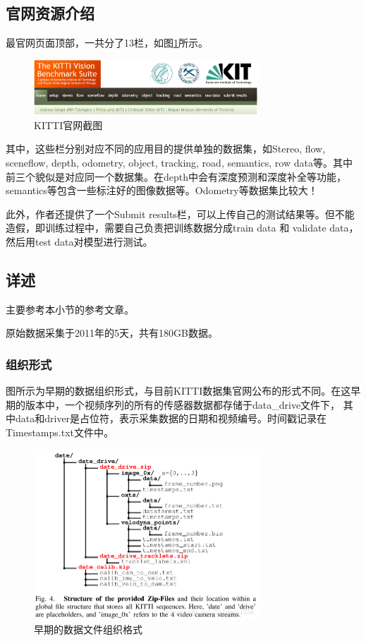 \subsection{官网资源介绍}

最官网页面顶部，一共分了13栏，如图\ref{KITTI0}所示。

\begin{figure}[!hbtp]
\centering
\includegraphics[width=0.75\textwidth]{SemanticSLAM/KITTI0.png}
\caption{KITTI官网截图}
\label{KITTI0}
\end{figure}

其中，这些栏分别对应不同的应用目的提供单独的数据集，如Stereo, flow, sceneflow, depth, odometry, object, tracking, road, semantics, row data等。其中前三个貌似是对应同一个数据集。在depth中会有深度预测和深度补全等功能，semantics等包含一些标注好的图像数据等。Odometry等数据集比较大！

此外，作者还提供了一个Submit results栏，可以上传自己的测试结果等。但不能造假，即训练过程中，需要自己负责把训练数据分成train data 和 validate data， 然后用test data对模型进行测试。

\subsection{详述}

主要参考本小节的参考文章。

原始数据采集于2011年的5天，共有180GB数据。 

\subsubsection{组织形式}

图所示为早期的数据组织形式，与目前KITTI数据集官网公布的形式不同。在这早期的版本中，一个视频序列的所有的传感器数据都存储于data\_drive文件下， 其中data和driver是占位符，表示采集数据的日期和视频编号。时间戳记录在Timestamps.txt文件中。

\begin{figure}[!hbtp]
\centering
\includegraphics[width=0.75\textwidth]{SemanticSLAM/KITTI1.png}
\caption{早期的数据文件组织格式}
\label{KITTI1}
\end{figure}

